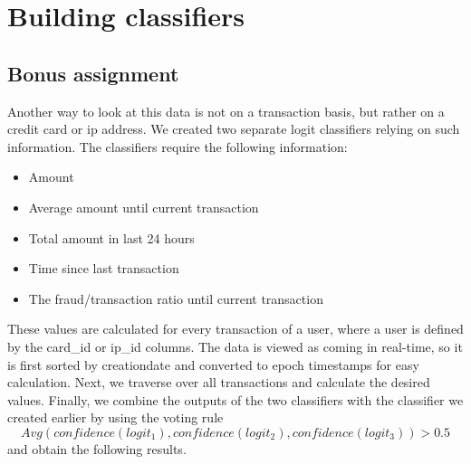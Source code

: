 \section*{Building classifiers}



\subsection*{Bonus assignment}
Another way to look at this data is not on a transaction basis, but rather on a credit card or ip address. We created two separate logit classifiers relying on such information. The classifiers require the following information:

\begin{itemize}
	\setlength\itemsep{0.05em}
	\item Amount
	\item Average amount until current transaction
	\item Total amount in last 24 hours
	\item Time since last transaction
	\item The fraud/transaction ratio until current transaction
\end{itemize}

These values are calculated for every transaction of a user, where a user is defined by the card\_id or ip\_id columns. The data is viewed as coming in real-time, so it is first sorted by creationdate and converted to epoch timestamps for easy calculation. Next, we traverse over all transactions and calculate the desired values. Finally, we combine the outputs of the two classifiers with the classifier we created earlier by using the voting rule $$Avg(confidence(logit_1), confidence(logit_2), confidence(logit_3))>0.5$$ and obtain the following results.

